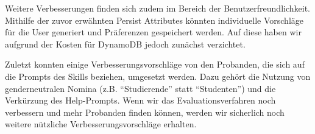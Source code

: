 \documentclass[12pt]{article}
\begin{document}
Weitere Verbesserungen finden sich zudem im Bereich der Benutzerfreundlichkeit.
Mithilfe der zuvor erwähnten Persist Attributes könnten individuelle Vorschläge für die User generiert und Präferenzen gespeichert werden.
Auf diese haben wir aufgrund der Kosten für DynamoDB jedoch zunächst verzichtet.

Zuletzt konnten einige Verbesserungsvorschläge von den Probanden, die sich auf die Prompts des Skills beziehen, umgesetzt werden.
Dazu gehört die Nutzung von genderneutralen Nomina (z.B. “Studierende” statt “Studenten”) und die Verkürzung des Help-Prompts.
Wenn wir das Evaluationsverfahren noch verbessern und mehr Probanden finden können, werden wir sicherlich noch weitere nützliche Verbesserungsvorschläge erhalten.

\newpage
{}







  
  
\end{document}
